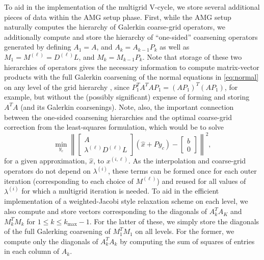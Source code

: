 To aid in the implementation of the multigrid V-cycle, we store
several additional pieces of data within the AMG setup phase.  First,
while the AMG setup naturally computes the hierarchy of Galerkin
coarse-grid operators, we additionally compute and store the hierarchy
of ``one-sided'' coarsening operators generated by defining $A_1 = A$,
and $A_k = A_{k-1}P_k$ as well as $M_1 = M^{(\ell)} = D^{(\ell)}L$,
and $M_k = M_{k-1}P_k$.  Note that storage of these two hierarchies of
operators gives the necessary information to compute matrix-vector
products with the full Galerkin coarsening of the normal equations
in \eqref{eq:normal} on any level of the grid hierarchy , since
$P_1^TA^TAP_1 = (AP_1)^T(AP_1)$, for example, but without the
(possibly significant) expense of forming and storing $A^TA$ (and its
Galerkin coarsenings).  Note, also, the important connection between
the one-sided coarsening hierarchies and the optimal coarse-grid
correction from the least-squares formulation, which would be to solve
\[
\min_{y_c}\left\| \left[\begin{array}{c} A \\ 
      \lambda^{(\ell)}D^{(\ell)}L\end{array}\right](\hat{x}+Py_c) - \left[\begin{array}{c} b \\ 0 \end{array}\right]\right\|^2,
\]
for a given approximation, $\hat{x}$, to $x^{(i,\ell)}$.  As the
interpolation and coarse-grid operators do not depend on
$\lambda^{(i)}$, these terms can be formed once for each outer
iteration (corresponding to each choice of $M^{(\ell)}$) and reused
for all values of $\lambda^{(i)}$ for which a multigrid iteration is
needed.  To aid in the efficient implementation of a weighted-Jacobi
style relaxation scheme on each level, we also compute and store
vectors corresponding to the diagonals of $A_k^TA_K$ and $M_k^TM_k$
for $1 \leq k \leq k_{\text{max}}-1$.  For the latter of these, we
simply store the diagonals of the full Galerking coarsening of
$M_1^TM_1$ on all levels.  For the former, we compute only the
diagonals of $A_k^TA_k$ by computing the sum of squares of entries in
each column of $A_k$.


